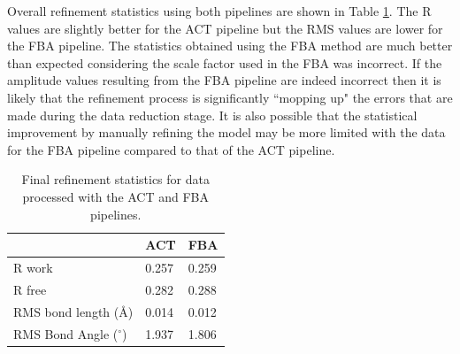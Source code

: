 Overall refinement statistics using both pipelines are shown in Table \ref{tab:Refinement statistics - C.Esp1396I}.
The R values are slightly better for the ACT pipeline but the RMS values are lower for the FBA pipeline.
The statistics obtained using the FBA method are much better than expected considering the scale factor used in the FBA was incorrect.
If the amplitude values resulting from the FBA pipeline are indeed incorrect then it is likely that the refinement process is significantly ``mopping up" the errors that are made during the data reduction stage.
It is also possible that the statistical improvement by manually refining the model may be more limited with the data for the FBA pipeline compared to that of the ACT pipeline.
\begin{table}[ht!]
	\caption[Final refinement statistics for data processed with the ACT and FBA pipelines.]{Final refinement statistics for data processed with the ACT and FBA pipelines.}
	\centering
	\begin{tabular}{p{4cm} | p{2.5cm} | p{2.5cm}}
		   & ACT & FBA  \\
		\hline
		R work                      & 0.257   & 0.259 \\
		R free                      & 0.282   & 0.288 \\
		RMS bond length (\AA)       & 0.014   & 0.012 \\
        RMS Bond Angle ($^{\circ}$) & 1.937   & 1.806 \\
		\hline
	\end{tabular}
	\label{tab:Refinement statistics - C.Esp1396I}
\end{table}
